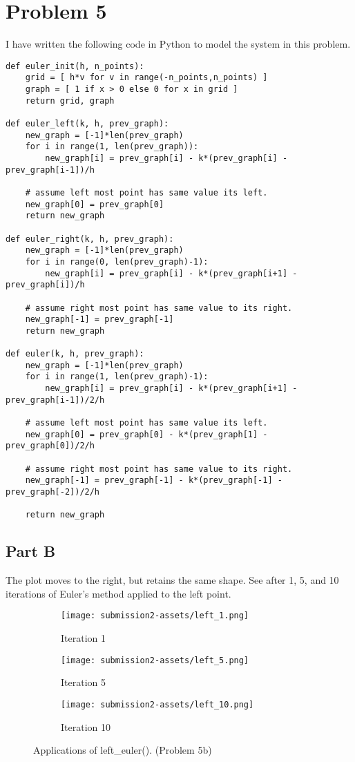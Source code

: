 \documentclass{article}
\begin{document}
\section*{Problem 5}
I have written the following code in Python to model the system in this problem.
\begin{verbatim}
def euler_init(h, n_points):
    grid = [ h*v for v in range(-n_points,n_points) ]
    graph = [ 1 if x > 0 else 0 for x in grid ]
    return grid, graph

def euler_left(k, h, prev_graph):
    new_graph = [-1]*len(prev_graph)
    for i in range(1, len(prev_graph)):
        new_graph[i] = prev_graph[i] - k*(prev_graph[i] - prev_graph[i-1])/h

    # assume left most point has same value its left.
    new_graph[0] = prev_graph[0]
    return new_graph

def euler_right(k, h, prev_graph):
    new_graph = [-1]*len(prev_graph)
    for i in range(0, len(prev_graph)-1):
        new_graph[i] = prev_graph[i] - k*(prev_graph[i+1] - prev_graph[i])/h

    # assume right most point has same value to its right.
    new_graph[-1] = prev_graph[-1]
    return new_graph

def euler(k, h, prev_graph):
    new_graph = [-1]*len(prev_graph)
    for i in range(1, len(prev_graph)-1):
        new_graph[i] = prev_graph[i] - k*(prev_graph[i+1] - prev_graph[i-1])/2/h

    # assume left most point has same value its left.
    new_graph[0] = prev_graph[0] - k*(prev_graph[1] - prev_graph[0])/2/h

    # assume right most point has same value to its right.
    new_graph[-1] = prev_graph[-1] - k*(prev_graph[-1] - prev_graph[-2])/2/h

    return new_graph
\end{verbatim}

\subsection*{Part B}
The plot moves to the right, but retains the same shape. See after 1, 5, and 10 iterations of Euler's method applied to the left point.
\begin{figure}[h!]
    \centering
    \begin{subfigure}[b]{0.3\linewidth}
        \texttt{[image: submission2-assets/left\_1.png]}
        \caption{Iteration 1}
    \end{subfigure}
    \begin{subfigure}[b]{0.3\linewidth}
        \texttt{[image: submission2-assets/left\_5.png]}
        \caption{Iteration 5}
    \end{subfigure}
    \begin{subfigure}[b]{0.3\linewidth}
        \texttt{[image: submission2-assets/left\_10.png]}
        \caption{Iteration 10}
    \end{subfigure}
    \caption{Applications of left\_euler(). (Problem 5b)}
\end{figure}
\end{document}
